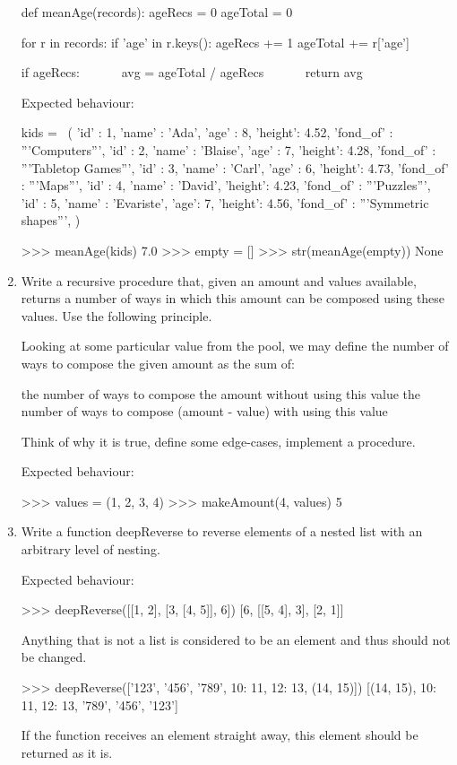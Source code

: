 \documentclass[]{article}
\begin{document}
\begin{enumerate}
def meanAge(records):
  ageRecs = 0
  ageTotal = 0

  for r in records:
    if 'age' in r.keys():
      ageRecs += 1
      ageTotal += r['age']

  if ageRecs:
   avg = ageTotal / ageRecs
   return avg


Expected behaviour:

kids = \
(
  {'id' : 1, 'name' : 'Ada', 'age' : 8, 'height': 4.52, 'fond_of' : '''Computers'''},
  {'id' : 2, 'name' : 'Blaise', 'age' : 7, 'height': 4.28, 'fond_of' : '''Tabletop Games'''},
  {'id' : 3, 'name' : 'Carl', 'age' : 6, 'height': 4.73, 'fond_of' : '''Maps'''},
  {'id' : 4, 'name' : 'David', 'height': 4.23, 'fond_of' : '''Puzzles'''},
  {'id' : 5, 'name' : 'Evariste', 'age': 7, 'height': 4.56, 'fond_of' : '''Symmetric shapes'''},
)

>>> meanAge(kids)
7.0
>>> empty = []
>>> str(meanAge(empty))
None

\item
Write a recursive procedure that, given an amount and values available,  returns a number of ways in which this amount can be composed using these values. Use the following principle.

Looking at some particular value from the pool, we may define the number of  ways to compose the given amount as the sum of:

     the number of ways to compose the amount without using this value
    the number of ways to compose (amount - value) with using this value


Think of why it is true, define some edge-cases, implement a procedure.

Expected behaviour: 

>>> values = (1, 2, 3, 4)
>>> makeAmount(4, values)
5

\item
Write a function deepReverse to reverse elements of a nested list with an arbitrary level of nesting.

Expected behaviour:

>>> deepReverse([[1, 2], [3, [4, 5]], 6])
[6, [[5, 4], 3], [2, 1]]


Anything that is not a list is considered to be an element and thus should not be changed.

>>> deepReverse(['123', '456', '789', {10: 11, 12: 13}, (14, 15)])
[(14, 15), {10: 11, 12: 13}, '789', '456', '123']


If the function receives an element straight away, this element should be returned as it is.


\end{enumerate}
\end{document}
